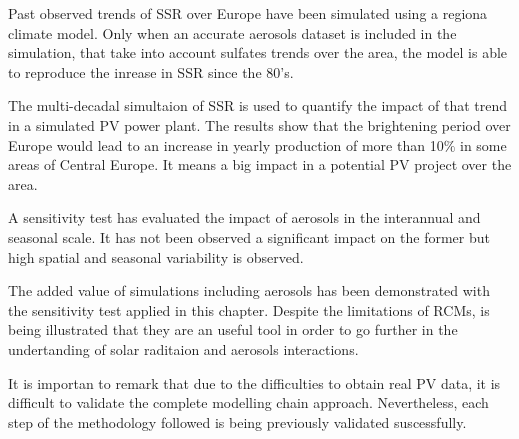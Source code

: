 Past observed trends of SSR over Europe have been simulated using a regiona climate model. Only when an accurate aerosols dataset is included in the simulation, that take into account sulfates trends over the area, the model is able to reproduce the inrease in SSR since the 80's.

The multi-decadal simultaion of SSR is used to quantify the impact of that trend in a simulated PV power plant. The results show that the brightening period over Europe would lead to an increase in yearly production of more than 10$\%$ in some areas of Central Europe. It means a big impact in a potential PV project over the area.

A sensitivity test has evaluated the impact of aerosols in the interannual and seasonal scale. It has not been observed a significant impact on the former but high spatial and seasonal variability is observed.


The added value of simulations including aerosols has been demonstrated with the sensitivity test applied in this chapter. Despite the limitations of RCMs, is being illustrated that they are an useful tool in order to go further in the undertanding of solar raditaion and aerosols interactions.


It is importan to remark that due to the difficulties to obtain real PV data, it is difficult to validate the complete modelling chain approach. Nevertheless, each step of the methodology followed is being previously validated suscessfully.

